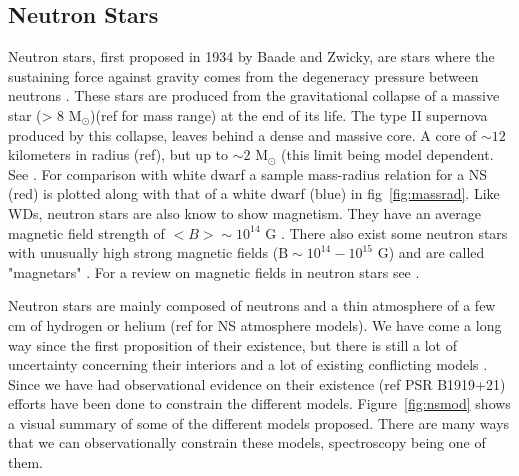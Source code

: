 \subsection{Neutron Stars}\label{sec:ns}

Neutron stars, first proposed in 1934 by Baade and Zwicky,  are stars where the sustaining force against gravity comes from  the degeneracy pressure between neutrons \citep{baade_cosmic_1934}. These stars are produced from the gravitational collapse of a massive star (> 8 M$_\odot$)(ref for mass range) at the end of its life. The type II supernova produced by this collapse, leaves behind a dense and massive core. A core of $\sim 12$ kilometers in radius (ref), but up to $\sim 2$ M$_\odot$ (this limit being model dependent. See \cite{lattimer_neutron_2007}. For comparison with white dwarf a sample mass-radius relation for a NS (red) is plotted along with that of a white dwarf (blue) in fig~\ref{fig:massrad}. Like WDs, neutron stars are also know to show magnetism. They have an average magnetic field strength of $<B>\sim 10^{14}$ G \citep{beskin2015magnetic}. There also exist some neutron stars with unusually high strong magnetic fields ($\text{B}\sim 10^{14} - 10^{15}\text{ G}$) and are called "magnetars" \citep{duncan_formation_1992}. For a review on magnetic fields in neutron stars see \cite{reisenegger_magnetic_2005}. 

Neutron stars are mainly composed of neutrons and a thin atmosphere of a few cm of hydrogen or helium (ref for NS atmosphere models). We have come a long way since the first proposition of their existence, but there is still a lot of  uncertainty concerning their interiors and a lot of existing conflicting models \citep{lattimer_neutron_2007}. Since we have had observational evidence on their existence (ref PSR B1919+21) efforts have been done to constrain the different models. Figure~\ref{fig:nsmod} shows a visual summary of some of the different models proposed. There are many ways that we can observationally constrain these models, spectroscopy being one of them.



